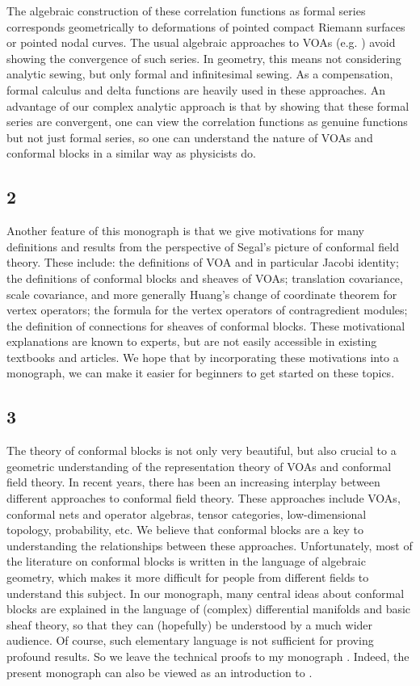 \documentclass[12pt,a4paper,notitlepage]{article}
\theoremstyle{definition}
\theoremstyle{plain}
\numberwithin{equation}{section}
\begin{document}
The algebraic construction of these correlation functions as formal series corresponds geometrically to deformations of pointed compact Riemann surfaces or pointed nodal curves. The usual algebraic approaches to VOAs (e.g. \cite{Kac,LL}) avoid showing the convergence of such series. In geometry, this means not considering analytic sewing, but only formal and infinitesimal sewing. As a compensation, formal calculus and delta functions are heavily used in these approaches. An advantage of our complex analytic approach is that by showing that these formal series are convergent, one can view the correlation functions as genuine functions but not just formal series, so one can understand the nature of VOAs and conformal blocks in a similar way as physicists do. 


\subsection*{2}

Another feature of this monograph is that we give motivations for many definitions and results from the perspective of Segal's picture of conformal field theory. These include: the definitions of VOA and in particular Jacobi identity; the definitions of conformal blocks and sheaves of VOAs; translation covariance, scale covariance, and more generally Huang's change of coordinate theorem for vertex operators; the formula for the vertex operators of contragredient modules; the definition of connections for sheaves of conformal blocks. These motivational explanations are known to experts, but are not easily accessible in existing textbooks and articles. We hope that by incorporating these motivations into a monograph, we can make it easier for beginners to get started on these topics.


\subsection*{3}

The theory of conformal blocks is not only very beautiful, but also crucial to a geometric understanding of the representation theory of VOAs and conformal field theory. In recent years, there has been an increasing interplay between different approaches to conformal field theory. These approaches include VOAs, conformal nets and operator algebras, tensor categories, low-dimensional topology, probability, etc. We believe that conformal blocks are a key to understanding the relationships between these approaches. Unfortunately, most of the literature on conformal blocks is written in the language of algebraic geometry, which makes it more difficult for people from different fields to understand this subject. In our monograph, many central ideas about conformal blocks are explained in the language of (complex) differential manifolds and basic sheaf theory, so that they can (hopefully) be understood by a much wider audience. Of course, such elementary language is not sufficient for proving profound results. So we leave the technical proofs to my monograph \cite{Gui}. Indeed, the present monograph can also be viewed as an introduction to \cite{Gui}.
\end{document}

